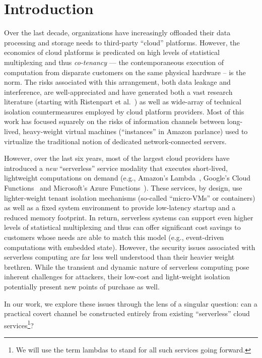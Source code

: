 \section{Introduction}
\label{sec:intro}

Over the last decade, organizations have increasingly offloaded their
data processing and storage needs to third-party ``cloud'' platforms.
However, the economics of cloud platforms is predicated on high levels
of statistical multiplexing and thus \emph{co-tenancy} --- the
contemporaneous execution of computation from disparate customers on
the same physical hardware -- is the norm.  The risks associated with
this arrangement, both data leakage and interference, are
well-appreciated and have generated both a vast research literature
(starting with Ristenpart et al.~\cite{ristenpartccs2009}) as well as
wide-array of technical isolation countermeasures employed by cloud
platform providers. Most of this work has focused squarely on the risks
of information channels between long-lived, heavy-weight virtual
machines (``instances'' in Amazon parlance) used to virtualize the
traditional notion of dedicated network-connected servers.

However, over the last six years, most of the largest cloud providers have
introduced a \emph{new} ``serverless'' service modality that executes
short-lived, lightweight computations on demand (e.g., Amazon's
Lambda~\cite{awslambda}, Google's Cloud Functions~\cite{gcpfunctions} and
Microsoft's Azure Functions~\cite{azurefunctions}).  These services, by design,
use lighter-weight tenant isolation mechanisms (so-called ``micro-VMs'' or
containers) as well as a fixed system environment to provide low-latency startup
and a reduced memory footprint.  In return, serverless systems can support even
higher levels of statistical multiplexing and thus can offer significant cost
savings to customers whose needs are able to match this model (e.g.,
event-driven computations with embedded state).  However, the security issues
associated with serverless computing are far less well understood than their
heavier weight brethren.  While the transient and dynamic nature of serverless
computing pose inherent challenges for attackers, their low-cost and
light-weight isolation potentially present new points of purchase as well.

In our work, we explore these issues through the lens of a singular question:
can a practical covert channel be constructed entirely from existing
``serverless'' cloud services\footnote{We will use the term lambdas to 
stand for all such services going forward.}?

